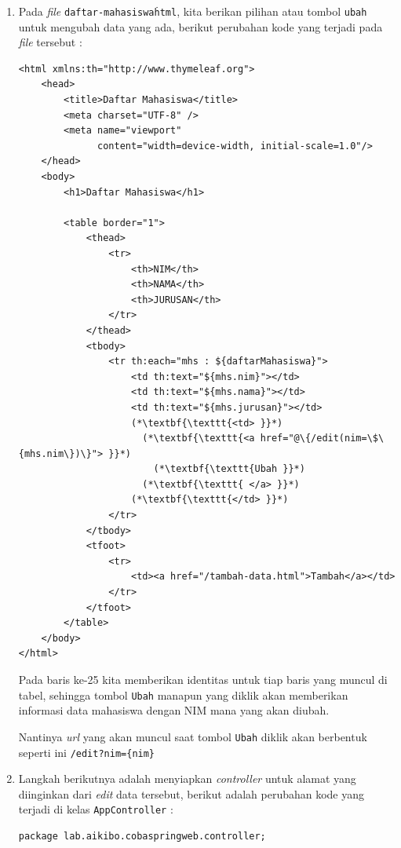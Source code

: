 \begin{enumerate}
	\item Pada \textit{file} \texttt{daftar-mahasiswa\.html}, kita berikan pilihan atau tombol \texttt{ubah} untuk mengubah data yang ada, berikut perubahan kode yang terjadi pada \textit{file} tersebut :
	
	\begin{lstlisting}
<html xmlns:th="http://www.thymeleaf.org">
    <head>
        <title>Daftar Mahasiswa</title>
        <meta charset="UTF-8" />
        <meta name="viewport" 
              content="width=device-width, initial-scale=1.0"/>
    </head>
    <body>
        <h1>Daftar Mahasiswa</h1>
        
        <table border="1">
            <thead>
                <tr>
                    <th>NIM</th>
                    <th>NAMA</th>
                    <th>JURUSAN</th>
                </tr>
            </thead>
            <tbody>
                <tr th:each="mhs : ${daftarMahasiswa}">
                    <td th:text="${mhs.nim}"></td>
                    <td th:text="${mhs.nama}"></td>
                    <td th:text="${mhs.jurusan}"></td>
                    (*\textbf{\texttt{<td> }}*)
                      (*\textbf{\texttt{<a href="@\{/edit(nim=\$\{mhs.nim\})\}"> }}*)
                        (*\textbf{\texttt{Ubah }}*)
                      (*\textbf{\texttt{ </a> }}*) 
                    (*\textbf{\texttt{</td> }}*)
                </tr>
            </tbody>
            <tfoot>
                <tr>
                    <td><a href="/tambah-data.html">Tambah</a></td>
                </tr>
            </tfoot>
        </table>
    </body>
</html>
	\end{lstlisting}

Pada baris ke-25 kita memberikan identitas untuk tiap baris yang muncul di tabel, sehingga tombol \texttt{Ubah} manapun yang diklik akan memberikan informasi data mahasiswa dengan NIM mana yang akan diubah.

Nantinya \textit{url} yang akan muncul saat tombol \texttt{Ubah} diklik akan berbentuk seperti ini \texttt{/edit?nim=\{nim\}}

	\item Langkah berikutnya adalah menyiapkan \textit{controller} untuk alamat yang diinginkan dari \textit{edit} data tersebut, berikut adalah perubahan kode yang terjadi di kelas \texttt{AppController} :
	
	\begin{lstlisting}
package lab.aikibo.cobaspringweb.controller;


\end{lstlisting}
\end{enumerate}
